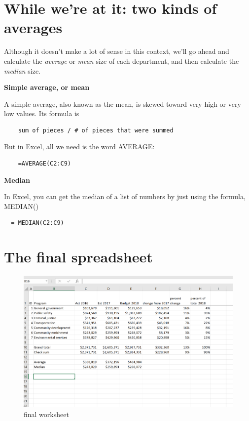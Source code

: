 \documentclass[
  letterpaper,
  DIV=11,
  numbers=noendperiod]{scrreprt}
\begin{document}
\hypertarget{while-were-at-it-two-kinds-of-averages}{%
\section{While we're at it: two kinds of
averages}\label{while-were-at-it-two-kinds-of-averages}}

Although it doesn't make a lot of sense in this context, we'll go ahead
and calculate the \emph{average} or \emph{mean} size of each department,
and then calculate the \emph{median} size.

\textbf{Simple average, or mean}

A simple average, also known as the mean, is skewed toward very high or
very low values. Its formula is

\begin{verbatim}
    sum of pieces / # of pieces that were summed
\end{verbatim}

But in Excel, all we need is the word AVERAGE:

\begin{verbatim}
    =AVERAGE(C2:C9)
\end{verbatim}

\textbf{Median}

In Excel, you can get the median of a list of numbers by just using the
formula, MEDIAN()

\begin{verbatim}
  = MEDIAN(C2:C9)
\end{verbatim}

\hypertarget{the-final-spreadsheet}{%
\section{The final spreadsheet}\label{the-final-spreadsheet}}

\begin{figure}

{\centering \includegraphics[width=1\textwidth,height=\textheight]{./images/xl_mathreview_07.png}

}

\caption{final worksheet}

\end{figure}
\end{document}

